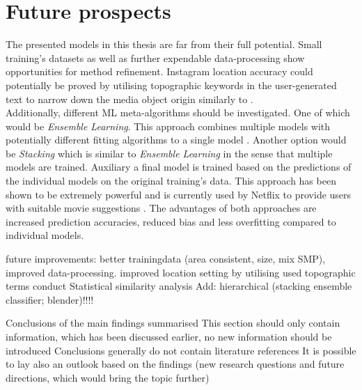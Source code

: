 \section{Future prospects} 
The presented models in this thesis are far from their full potential. Small training's datasets as well as further expendable data-processing show opportunities for method refinement. Instagram location accuracy could potentially be proved by utilising topographic keywords in the user-generated text to narrow down the media object origin similarly to \parencite{Ostermann2015}. \\
Additionally, different ML meta-algorithms should be investigated. One of which would be \textit{Ensemble Learning}. This approach combines multiple models with potentially different fitting algorithms to a single model \parencite{Zhou2009}. Another option would be \textit{Stacking} which is similar to \textit{Ensemble Learning} in the sense that multiple models are trained. Auxiliary a final model is trained based on the predictions of the individual models on the original training's data. This approach has been shown to be extremely powerful and is currently used by Netflix to provide users with suitable movie suggestions \parencite{AndreasToscher2009}. The advantages of both approaches are increased prediction accuracies, reduced bias and less overfitting compared to individual models. 



future improvements: better trainingdata (area consistent, size, mix SMP), improved data-processing. improved location setting by utilising used topographic terms
conduct Statistical similarity analysis
Add: hierarchical (stacking ensemble classifier; blender)!!!!

    Conclusions of the main findings summarised
    This section should only contain information, which has been discussed earlier, no new information should be introduced
    Conclusions generally do not contain literature references
    It is possible to lay also an outlook based on the findings (new research questions and future directions, which would bring the topic further)


